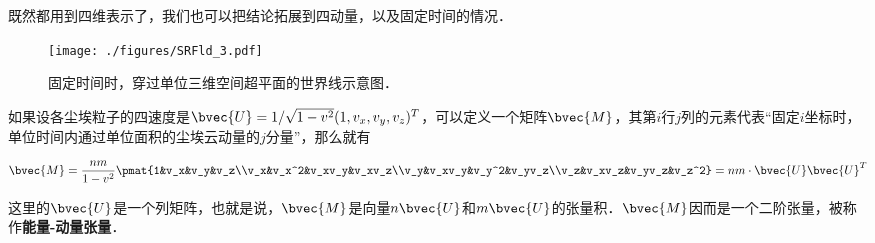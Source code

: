 既然都用到四维表示了，我们也可以把结论拓展到四动量，以及固定时间的情况．

\begin{figure}[ht]
\centering
\texttt{[image: ./figures/SRFld\_3.pdf]}
\caption{固定时间时，穿过单位三维空间超平面的世界线示意图．} \label{SRFld_fig3}
\end{figure}




如果设各尘埃粒子的四速度是$\bvec{U}=1/\sqrt{1-v^2}(1, v_x, v_y, v_z)^T$，可以定义一个矩阵$\bvec{M}$，其第$i$行$j$列的元素代表“固定$i$坐标时，单位时间内通过单位面积的尘埃云动量的$j$分量”，那么就有

\begin{equation}
\bvec{M}=\frac{nm}{1-v^2}\pmat{1&v_x&v_y&v_z\\v_x&v_x^2&v_xv_y&v_xv_z\\v_y&v_xv_y&v_y^2&v_yv_z\\v_z&v_xv_z&v_yv_z&v_z^2}=nm\cdot\bvec{U}\bvec{U}^T
\end{equation}

这里的$\bvec{U}$是一个列矩阵，也就是说，$\bvec{M}$是向量$n\bvec{U}$和$m\bvec{U}$的张量积．$\bvec{M}$因而是一个二阶张量，被称作\textbf{能量-动量张量}．






